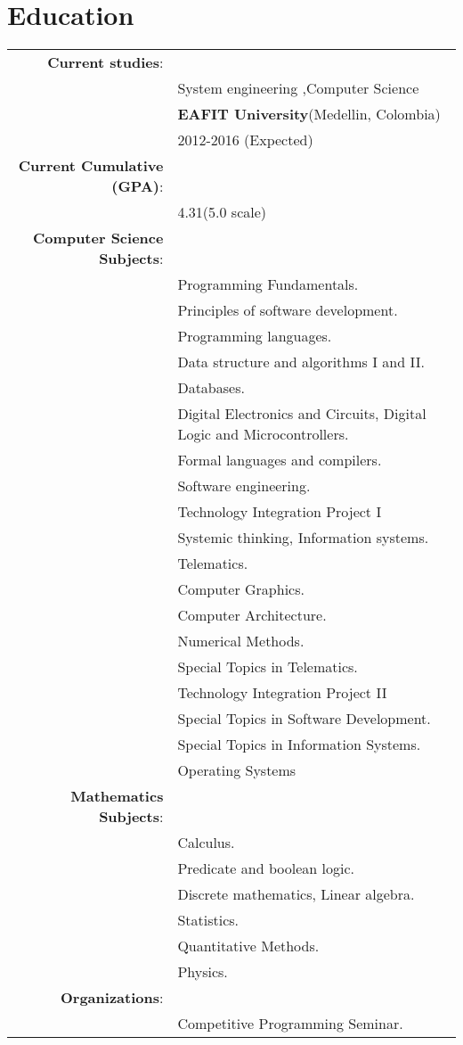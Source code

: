 \documentclass[a4paper,10pt]{article} %
\begin{document}
\section{Education}
\begin{tabular}{rl}
\textbf{Current studies}:\\
&\textsc{}System engineering ,Computer Science\\
&\textbf{EAFIT University}(Medellin, Colombia)\\
& 2012-2016 (Expected)\\
\textbf{Current Cumulative (GPA)}:\\
&\textsc{}4.31(5.0 scale)\\
\textbf{Computer Science Subjects}:\\
&\textbf{}Programming Fundamentals.\\
&\textbf{}Principles of software development.\\
&\textbf{}Programming languages.\\
&\textbf{}Data structure and algorithms I and II.\\
&\textbf{}Databases.\\
&\textbf{}Digital Electronics and Circuits, Digital Logic and Microcontrollers.\\
&\textbf{}Formal languages and compilers.\\
&\textbf{}Software engineering.\\
&\textbf{}Technology Integration Project I\\
&\textbf{}Systemic thinking, Information systems.\\
&\textbf{}Telematics.\\
&\textbf{}Computer Graphics.\\
&\textbf{}Computer Architecture.\\
&\textbf{}Numerical Methods.\\
&\textbf{}Special Topics in Telematics.\\
&\textbf{}Technology Integration Project II\\
&\textbf{}Special Topics in Software Development.\\
&\textbf{}Special Topics in Information Systems.\\
&\textbf{}Operating Systems\\
\textbf{Mathematics Subjects}:\\
&\textbf{}Calculus.\\
&\textbf{}Predicate and boolean logic.\\
&\textbf{}Discrete mathematics, Linear algebra.\\
&\textbf{}Statistics.\\
&\textbf{}Quantitative Methods.\\
&\textbf{}Physics.\\
\textbf{Organizations}:\\
&\textbf{}Competitive Programming Seminar.
\end{tabular}
\newpage
\end{document}
